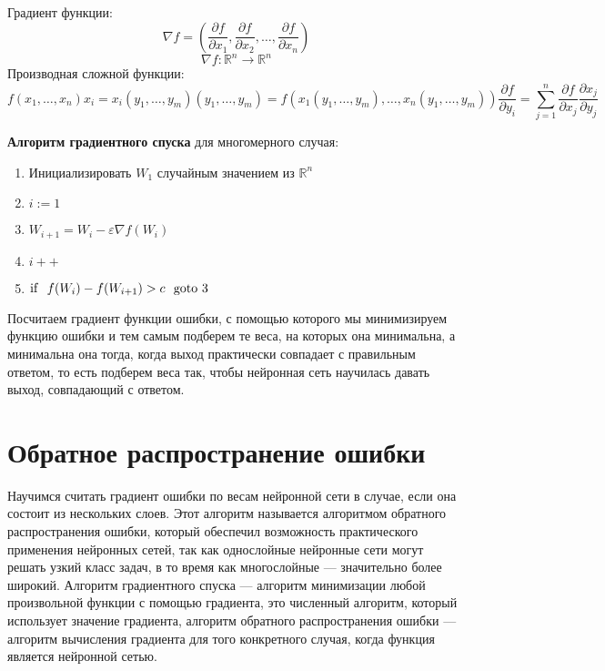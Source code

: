 \documentclass[14pt]{extreport}
\begin{document}
        Градиент функции: $$\nabla f = \left(\frac{\partial f}{\partial x_1}, \frac{\partial f}{\partial x_2}, \ldots, \frac{\partial f}{\partial x_n}\right)$$
        $$\nabla f:\mathbb{R}^n\rightarrow \mathbb{R}^n$$
        Производная сложной функции:
            \[f(x_1, \ldots, x_n)
            x_i = x_i(y_1, \ldots, y_m)
            (y_1, \ldots, y_m) = f(x_1(y_1, \ldots, y_m), \ldots, x_n(y_1, \ldots, y_m))
            \frac{\partial f}{\partial y_i} = \sum_{j=1}^{n} \frac{\partial f}{\partial x_j}\frac{\partial x_j}{\partial y_j}\]

        \textbf{
            Алгоритм градиентного спуска
        } для многомерного случая:
        \begin{enumerate}
             \item Инициализировать $W_1$ случайным значением из $\mathbb{R}^n$
             \item $i:=1$
             \item $W_{i+1}=W_i-\varepsilon \nabla f(W_i)$
             \item $i++$
             \item ${\rm if}\ \ f(W_{i})-f(W_{i+1})>c\ \ {\rm goto}\ 3$
        \end{enumerate}

        Посчитаем градиент функции ошибки, с помощью которого мы минимизируем функцию ошибки и тем самым подберем те веса, на которых она минимальна, а минимальна она тогда, когда выход практически совпадает с правильным ответом, то есть подберем веса так, чтобы нейронная сеть научилась давать выход, совпадающий с ответом.

        \section{Обратное распространение ошибки}

        Научимся считать градиент ошибки по весам нейронной сети в случае, если она состоит из нескольких слоев. Этот алгоритм называется алгоритмом обратного распространения ошибки, который обеспечил возможность практического применения нейронных сетей, так как однослойные нейронные сети могут решать узкий класс задач, в то время как многослойные --- значительно более широкий. Алгоритм градиентного спуска --- алгоритм минимизации любой произвольной функции с помощью градиента, это численный алгоритм, который использует значение градиента, алгоритм обратного распространения ошибки --- алгоритм вычисления градиента для того конкретного случая, когда функция является нейронной сетью.
\end{document}

